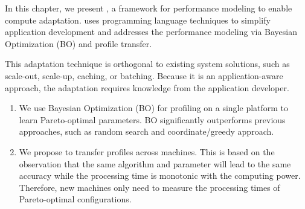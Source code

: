 
In this chapter, we present \brt{}, a framework for performance modeling to
enable compute adaptation. \brt{} uses programming language techniques to
simplify application development and addresses the performance modeling via
Bayesian Optimization (BO) and profile transfer.

This adaptation technique is orthogonal to existing system solutions, such as
scale-out, scale-up, caching, or batching. Because it is an application-aware
approach, the adaptation requires knowledge from the application developer.

\begin{enumerate}[leftmargin=*, topsep=5pt, itemsep=5pt]
\item We use Bayesian Optimization (BO) for profiling on a single platform to
  learn Pareto-optimal parameters. BO significantly outperforms previous
  approaches, such as random search and coordinate/greedy approach.
\item We propose to transfer profiles across machines. This is based on the
  observation that the same algorithm and parameter will lead to the same
  accuracy while the processing time is monotonic with the computing
  power. Therefore, new machines only need to measure the processing times of
  Pareto-optimal configurations.
\end{enumerate}


